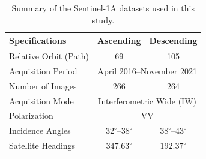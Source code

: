 \begin{table}[htbp]
	\centering
	\caption{Summary of the Sentinel-1A datasets used in this study.}
	\label{tab:sentinel1_info}
	\begin{tabular}{lcc}
		\toprule
		\textbf{Specifications} & \textbf{Ascending} & \textbf{Descending} \\
		\midrule
		Relative Orbit (Path) & 69 & 105 \\
		\multicolumn{1}{l}{Acquisition Period} & \multicolumn{2}{c}{April 2016--November 2021} \\
		Number of Images      & 266 & 264 \\
		\multicolumn{1}{l}{Acquisition Mode} & \multicolumn{2}{c}{Interferometric Wide (IW)} \\
		\multicolumn{1}{l}{Polarization} & \multicolumn{2}{c}{VV} \\
		Incidence Angles & $32^{\circ}$--$38^{\circ}$ & $38^{\circ}$--$43^{\circ}$ \\
		Satellite Headings & $347.63^{\circ}$ & $192.37^{\circ}$ \\
		\bottomrule
	\end{tabular}
\end{table}

\clearpage
